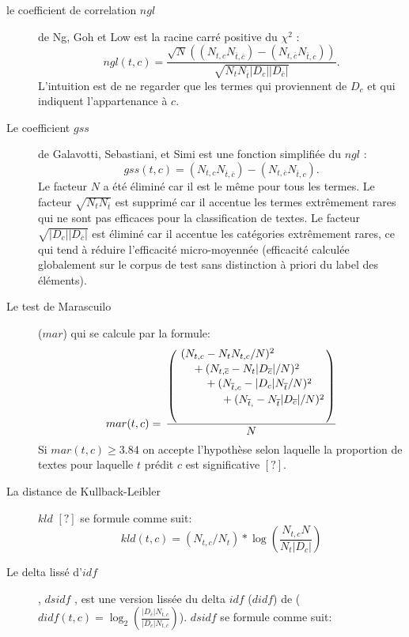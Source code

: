 \begin{description}
	\item[le coefficient de correlation $ngl$] de Ng, Goh et Low \citep{ng1997ngl} est la racine carré positive du $\chi^2$ \citep{schutze1995chi2}:
	\[ngl(t,c) = \frac{\sqrt{N} ((N_{t,c} N_{\overline{t},\overline{c}}) - (N_{t,\overline{c}} N_{\overline{t},c}))}{\sqrt{N_t N_{\overline{t}} \vert D_c \vert  \vert D_{\overline{c}} \vert }}.\]
	L'intuition est de ne regarder que les termes qui proviennent de $D_c$ et qui indiquent l'appartenance à $c$.
	\item[Le coefficient $gss$] de Galavotti, Sebastiani, et Simi
	 \citep{galavotti2000gss} est une fonction simplifiée du $ngl$ \citep{ng1997ngl} :
	\[gss(t,c) = (N_{t,c} N_{\overline{t},\overline{c}}) -  (N_{t,\overline{c}} N_{\overline{t},c}).\]
   Le facteur $N$ a été éliminé car il est le même pour tous les termes. Le facteur $\sqrt{N_tN_{\overline{t}}}$ est supprimé car il accentue les termes extrêmement rares qui ne sont pas efficaces pour la classification de textes. Le facteur  $\sqrt{\vert D_c \vert \vert D_{\overline{c}} \vert}$ est éliminé car il accentue les catégories extrêmement rares, ce qui tend à réduire l'efficacité micro-moyennée (efficacité calculée globalement sur le corpus de test sans distinction à priori du label des éléments).
   \item[Le test de Marascuilo] ($mar$) qui se calcule par la formule:
    \begin{equation*} mar(t, c) =  
    \,
    \dfrac{\left(
    	\splitdfrac{\splitdfrac{\splitdfrac{(N_{t,c} - N_{t}N_{t,c}/N)^2}{+ (N_{t,\overline{c}} - N_{t} \vert D_{\overline{c}} \vert /N)^2}}{+ (N_{\overline{t},c} - \vert D_c \vert N_{\overline{t}}/N)^2}}{+ (N_{\overline{t},\overline{}} - N_{\overline{t}} \vert D_{\overline{c}} \vert /N)^2}\right)}{N}
    \end{equation*}
    Si $ mar(t, c) \geq 3.84$ on accepte l'hypothèse selon laquelle la proportion de textes pour laquelle $t$ prédit $c$ est significative $[?]$.
    \item[La distance de Kullback-Leibler] $kld$ $[?]$ se formule comme suit:
    \[kld(t, c)=(N_{t,c} / N_{t}) * \log (\frac{N_{t,c} N}{N_{t}\vert D_c \vert})\]
    \item[Le \og delta lissé d'$idf$\fg{}], $dsidf$ \citep{paltoglou2010dsidfANDdbidf}, est une version lissée du delta $idf$ ($didf$) de \citet{martineau2009didf} ($didf(t,c)=\log_2\left(\frac{\vert D_{\overline{c}} \vert N_{t,c}}{\vert D_c \vert N_{t,\overline{c}}}\right)$). $dsidf$ se formule comme suit:

\end{description}
